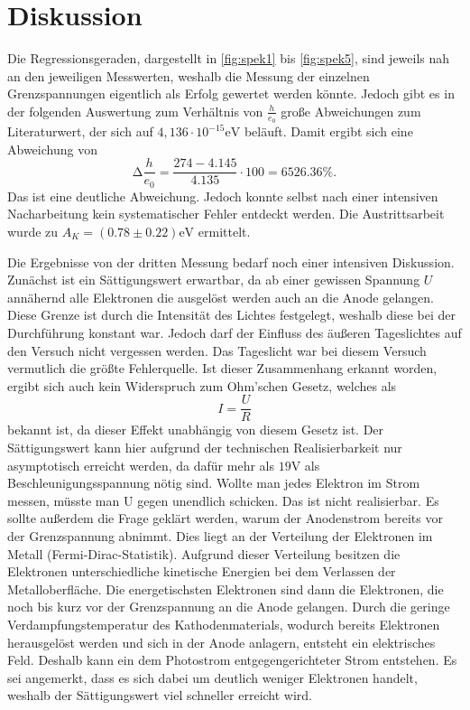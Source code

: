 \section{Diskussion}
\label{sec:Diskussion}

Die Regressionsgeraden, dargestellt in \autoref{fig:spek1} bis \autoref{fig:spek5}, sind jeweils
nah an den jeweiligen Messwerten, weshalb die Messung der einzelnen Grenzspannungen eigentlich als Erfolg gewertet werden könnte.
Jedoch gibt es in der folgenden Auswertung zum Verhältnis von $\frac{h}{e_0}$ große Abweichungen zum Literaturwert,
der sich auf $4,136 \cdot 10^{-15} \unit\eV$ beläuft.
Damit ergibt sich eine Abweichung von 
\begin{equation*}
    \increment \frac{h}{e_0} = \frac{274 - 4.145}{4.135} \cdot 100 = 6526.36 \%.
\end{equation*}
Das ist eine deutliche Abweichung. Jedoch konnte selbst nach einer intensiven Nacharbeitung kein systematischer Fehler entdeckt werden.
Die Austrittsarbeit wurde zu $A_K = (0.78 ±  0.22) \unit{\eV}$ ermittelt.

Die Ergebnisse von der dritten Messung bedarf noch einer intensiven Diskussion.
Zunächst ist ein Sättigungswert erwartbar, da ab einer gewissen Spannung $U$ annähernd alle
Elektronen die ausgelöst werden auch an die Anode gelangen.
Diese Grenze ist durch die Intensität des Lichtes festgelegt, weshalb diese bei der Durchführung 
konstant war. Jedoch darf der Einfluss des äußeren Tageslichtes auf den Versuch nicht vergessen werden.
Das Tageslicht war bei diesem Versuch vermutlich die größte Fehlerquelle.
Ist dieser Zusammenhang erkannt worden, ergibt sich auch kein Widerspruch zum Ohm'schen
Gesetz, welches als
\begin{equation*}
    I = \frac{U}{R}
\end{equation*}
bekannt ist, da dieser Effekt unabhängig von diesem Gesetz ist.
Der Sättigungswert kann hier aufgrund der technischen Realisierbarkeit nur asymptotisch erreicht werden,
da dafür mehr als $19 \unit\volt$ als Beschleunigungsspannung nötig sind.
Wollte man jedes Elektron im Strom messen, müsste man U gegen unendlich schicken.
Das ist nicht realisierbar.
Es sollte außerdem die Frage geklärt werden, warum der Anodenstrom bereits vor der
Grenzspannung abnimmt. Dies liegt an der Verteilung der Elektronen im Metall (Fermi-Dirac-Statistik).
Aufgrund dieser Verteilung besitzen die Elektronen unterschiedliche kinetische Energien bei
dem Verlassen der Metalloberfläche. Die energetischsten Elektronen sind dann die Elektronen, die noch bis kurz
vor der Grenzspannung an die Anode gelangen.
Durch die geringe Verdampfungstemperatur des Kathodenmaterials, wodurch bereits Elektronen herausgelöst werden und sich in der Anode anlagern,
entsteht ein elektrisches Feld.
Deshalb kann ein dem Photostrom entgegengerichteter Strom entstehen.
Es sei angemerkt, dass es sich dabei um deutlich weniger Elektronen handelt, weshalb der Sättigungswert viel schneller erreicht wird.

